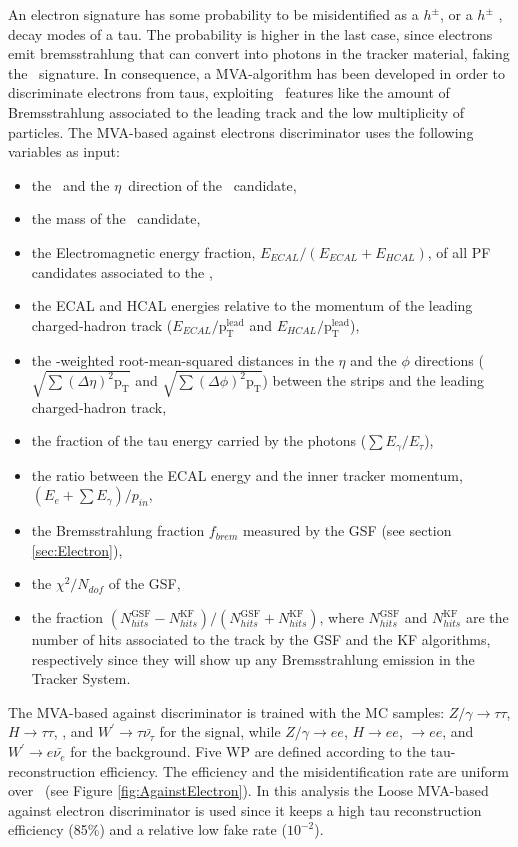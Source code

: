 \noindent An electron signature has some probability to be misidentified as 
a $h^{\pm}$, or a $h^{\pm}$ \picero, decay modes of a tau. The probability 
is higher in the last case, since electrons emit bremsstrahlung that
can convert into photons in the tracker material, faking the \picero~signature. In 
consequence, a MVA-algorithm has been developed in order to discriminate 
electrons from taus, exploiting \tauh~features like the amount of 
Bremsstrahlung associated to the leading track and the low 
multiplicity of particles. The MVA-based against electrons discriminator 
uses the following variables as input:
\begin{itemize}
 \item the \pt~and the $\eta$~direction of the \tauh~candidate,
 \item the mass of the \tauh~candidate,
 \item the Electromagnetic energy fraction, $E_{ECAL}/(E_{ECAL}+E_{HCAL})$, of all 
 PF candidates associated to the \tauh,
 \item the ECAL and HCAL energies relative to the momentum of the leading charged-hadron 
 track ($E_{ECAL}/\textrm{p}_{\textrm{T}}^{\textrm{lead}}$ and $E_{HCAL}/\textrm{p}_{\textrm{T}}^{\textrm{lead}}$),
 \item the \pt-weighted root-mean-squared distances in the $\eta$ and the $\phi$ directions 
 ($\sqrt{\sum(\Delta \eta)^{2}\textrm{p}_{\textrm{T}}}$ and 
 $\sqrt{\sum(\Delta \phi)^{2}\textrm{p}_{\textrm{T}}}$) between the strips and the leading 
 charged-hadron track,
 \item the fraction of the tau energy carried by the photons ($\sum E_{\gamma} / E_{\tau}$),
 \item the ratio between the ECAL energy and the inner tracker momentum, $(E_{e}+\sum E_{\gamma})/p_{in}$,
 \item the Bremsstrahlung fraction $f_{brem}$ measured by the GSF (see section \ref{sec:Electron}),
 \item the $\chi^{2}/N_{dof}$ of the GSF,
 \item the fraction $(N_{hits}^{\textrm{GSF}}-N_{hits}^{\textrm{KF}})/(N_{hits}^{\textrm{GSF}}+N_{hits}^{\textrm{KF}})$, where
 $N_{hits}^{\textrm{GSF}}$ and $N_{hits}^{\textrm{KF}}$ are the number of hits associated to the track by the GSF and the KF algorithms,
 respectively since they will show up any Bremsstrahlung emission in the Tracker System. 
\end{itemize}
 
\noindent The MVA-based against discriminator is trained with the MC samples: 
$Z/\gamma \rightarrow \tau\tau$, $H \rightarrow \tau\tau$, \Zprimetotautau, and $W^{\prime} 
\rightarrow \tau\bar{\nu_{\tau}}$ for the signal, while
$Z/\gamma \rightarrow ee$, $H \rightarrow ee$, \Zprime$\rightarrow ee$, and $W^{\prime} 
\rightarrow e\bar{\nu_{e}}$ for the background. Five WP are defined according to the 
tau-reconstruction efficiency. The efficiency and the misidentification rate are uniform over 
\pt~(see Figure \ref{fig:AgainstElectron}). In this 
analysis the Loose MVA-based against electron discriminator is used 
since it keeps a high tau reconstruction efficiency (85$\%$) and a relative 
low fake rate ($10 ^{-2}$).


